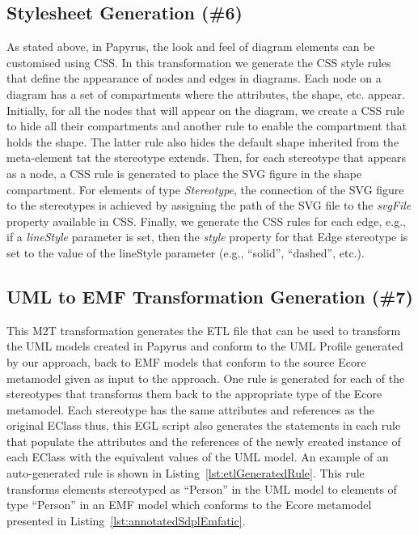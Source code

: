 \subsection{Stylesheet Generation (\#6)}
\label{sec:cssGeneration}
As stated above, in Papyrus, the look and feel of diagram elements can be 
customised using CSS. In this transformation we generate the CSS style rules 
that define the appearance of nodes and edges in diagrams. Each node on a 
diagram has a set of compartments where the attributes, the shape, etc. appear. 
Initially, for all the nodes that will appear on the diagram, we create a CSS 
rule to hide all their compartments and another rule to enable the compartment 
that holds the shape. The latter rule also hides the default shape inherited 
from the meta-element tat the stereotype extends. 
Then, for each stereotype that appears as 
a node, a CSS rule is generated to place the SVG figure in the shape 
compartment. 
For elements of type \textit{Stereotype}, the connection of the SVG figure to 
the stereotypes is achieved by assigning the path of the SVG file to the 
\textit{svgFile} property available in CSS. Finally, we generate the CSS 
rules for each edge, e.g., if a \emph{lineStyle} parameter is set, then the 
\textit{style} property for that Edge stereotype is set to the value of the 
lineStyle parameter (e.g., ``solid'', ``dashed'', etc.).

\subsection{UML to EMF Transformation Generation (\#7)}
\label{sec:uml2emf}
This M2T transformation generates the ETL file that can be used to transform 
the UML models created in Papyrus and conform to the UML Profile generated by 
our approach, back to EMF models that conform to the source Ecore metamodel 
given as input to the approach. One rule is generated for each of the 
stereotypes that transforms them back to the appropriate type of the Ecore 
metamodel. Each stereotype has the same attributes and references as the 
original EClass thus, this EGL script also generates the statements in each 
rule that populate the attributes and the references of the newly created 
instance of each EClass with the equivalent values of the UML model. An example 
of an auto-generated rule is shown in Listing~\ref{lst:etlGeneratedRule}. This 
rule transforms elements stereotyped as ``Person'' in the UML model to elements 
of type ``Person'' in an EMF model which conforms to the Ecore metamodel 
presented in Listing~\ref{lst:annotatedSdplEmfatic}.

